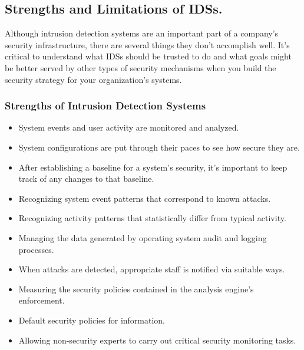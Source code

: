 \documentclass[12pt]{article}
\begin{document}
    \subsection{Strengths and Limitations of IDSs.}
    \par Although intrusion detection systems are an important part of a company's security infrastructure, there are several things they don't accomplish well. It's critical to understand what IDSs should be trusted to do and what goals might be better served by other types of security mechanisms when you build the security strategy for your organization's systems.
    
    \subsubsection{Strengths of Intrusion Detection Systems}
    \begin{itemize}
        \item System events and user activity are monitored and analyzed.
        \item System configurations are put through their paces to see how secure they are.
        \item After establishing a baseline for a system's security, it's important to keep track of any changes to that baseline.
        \item Recognizing system event patterns that correspond to known attacks.
        \item Recognizing activity patterns that statistically differ from typical activity.
        \item Managing the data generated by operating system audit and logging processes.
        \item When attacks are detected, appropriate staff is notified via suitable ways.
        \item Measuring the security policies contained in the analysis engine's enforcement.
        \item Default security policies for information.
        \item Allowing non-security experts to carry out critical security monitoring tasks.
    \end{itemize}
    
\end{document}
